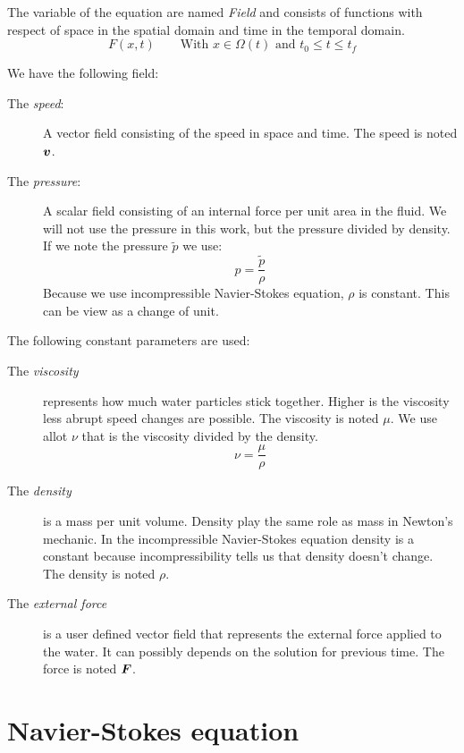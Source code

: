 The variable of the equation are named \emph{Field} and consists of functions with respect of space in the spatial domain and time in the temporal domain.
\begin{equation}
 F(x,t)\qquad \text{With $x\in\Omega(t)$ and $t_0\leq t \leq t_f$}
\end{equation}

We have the following field:
\begin{description}
\item[The \emph{speed}:] A vector field consisting of the speed in space and time.
The speed is noted ${\boldsymbol {v}}$.
\item[The \emph{pressure}:] A scalar field consisting of an internal force per unit area in the fluid.
We will not use the pressure in this work, but the pressure divided by density.
If we note the pressure $\tilde{p}$ we use:
\begin{equation}
 p=\frac{\tilde{p}}{\rho}
\end{equation}
Because we use incompressible Navier-Stokes equation, $\rho$ is constant. This can be view as a change of unit.
\end{description}

The following constant parameters are used:
\begin{description}
\item[The \emph{viscosity}] represents how much water particles stick together.
Higher is the viscosity less abrupt speed changes are possible.
The viscosity is noted $\mu$. We use allot $\nu$ that is the viscosity divided by the density.
\begin{equation}
 \nu=\frac{\mu}{\rho}
\end{equation}
\item[The \emph{density}] is a mass per unit volume.
Density play the same role as mass in Newton's mechanic.
In the incompressible Navier-Stokes equation density is a constant because incompressibility tells us that density doesn't change.
The density is noted $\rho$.
\item[The \emph{external force}] is a user defined vector field that represents the external force applied to the water.
It can possibly depends on the solution for previous time.
The force is noted ${\boldsymbol {F}}$.
\end{description}

\section{Navier-Stokes equation}

